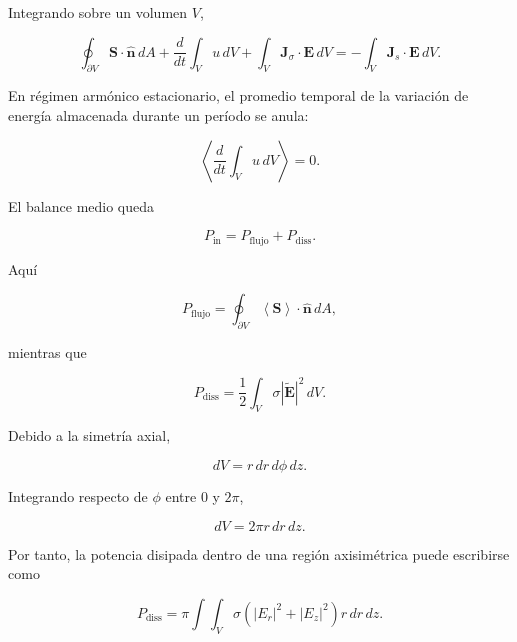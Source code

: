 Integrando sobre un volumen $V$,

\begin{equation}
\oint_{\partial V}
\mathbf{S}\cdot\hat{\mathbf{n}}\,dA
+
\frac{d}{dt}
\int_V u\,dV
+
\int_V
\mathbf{J}_{\sigma}\cdot\mathbf{E}\,dV
=
-
\int_V
\mathbf{J}_s\cdot\mathbf{E}\,dV.
\end{equation}

En régimen armónico estacionario, el promedio temporal de la variación de energía almacenada durante un período se anula:

\begin{equation}
\left\langle
\frac{d}{dt}
\int_Vu\,dV
\right\rangle
=
0.
\end{equation}

El balance medio queda

\begin{equation}
P_{\mathrm{in}}
=
P_{\mathrm{flujo}}
+
P_{\mathrm{diss}}.
\label{eq:balance_general}
\end{equation}

Aquí

\begin{equation}
P_{\mathrm{flujo}}
=
\oint_{\partial V}
\left\langle
\mathbf{S}
\right\rangle
\cdot
\hat{\mathbf{n}}
\,dA,
\label{eq:Pflujo}
\end{equation}

mientras que

\begin{equation}
P_{\mathrm{diss}}
=
\frac{1}{2}
\int_V
\sigma|\widetilde{\mathbf{E}}|^2\,dV.
\label{eq:Pdiss}
\end{equation}

Debido a la simetría axial,

\begin{equation}
dV
=
r\,dr\,d\phi\,dz.
\end{equation}

Integrando respecto de $\phi$ entre $0$ y $2\pi$,

\begin{equation}
dV
=
2\pi r\,dr\,dz.
\end{equation}

Por tanto, la potencia disipada dentro de una región axisimétrica puede escribirse como

\begin{equation}
P_{\mathrm{diss}}
=
\pi
\int\int_V
\sigma
\left(
|E_r|^2+|E_z|^2
\right)
r\,dr\,dz.
\label{eq:Pdiss_cilindrica}
\end{equation}

